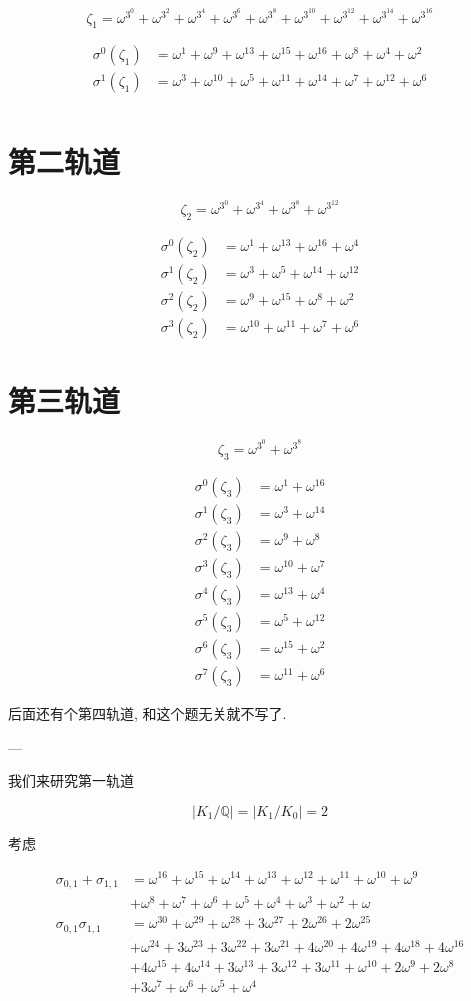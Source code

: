 $$
ζ_1=ω^{3^{0}}+ω^{3^{2}}+ω^{3^{4}}+ω^{3^{6}}+ω^{3^{8}}+ω^{3^{10}}+ω^{3^{12}}+ω^{3^{14}}+ω^{3^{16}}
$$

$$
\begin{aligned}
σ^{0}(ζ_{1})&=ω^{1}+ω^{9}+ω^{13}+ω^{15}+ω^{16}+ω^{8}+ω^{4}+ω^{2}\\
σ^{1}(ζ_{1})&=ω^{3}+ω^{10}+ω^{5}+ω^{11}+ω^{14}+ω^{7}+ω^{12}+ω^{6}\\
\end{aligned}
$$

\section{第二轨道}


$$
ζ_{2}=ω^{3^{0}}+ω^{3^{4}}+ω^{3^{8}}+ω^{3^{12}}
$$

$$
\begin{aligned}
σ^{0}(ζ_{2})&=ω^{1}+ω^{13}+ω^{16}+ω^{4}\\
σ^{1}(ζ_{2})&=ω^{3}+ω^{5}+ω^{14}+ω^{12}\\
σ^{2}(ζ_{2})&=ω^{9}+ω^{15}+ω^{8}+ω^{2}\\
σ^{3}(ζ_{2})&=ω^{10}+ω^{11}+ω^{7}+ω^{6}
\end{aligned}
$$

\section{第三轨道}


$$
ζ_{3}=ω^{3^{0}}+ω^{3^{8}}
$$

$$
\begin{aligned}
σ^{0}(ζ_{3})&=ω^{1}+ω^{16}\\
σ^{1}(ζ_{3})&=ω^{3}+ω^{14}\\
σ^{2}(ζ_{3})&=ω^{9}+ω^{8}\\
σ^{3}(ζ_{3})&=ω^{10}+ω^{7}\\
σ^{4}(ζ_{3})&=ω^{13}+ω^{4}\\
σ^{5}(ζ_{3})&=ω^{5}+ω^{12}\\
σ^{6}(ζ_{3})&=ω^{15}+ω^{2}\\
σ^{7}(ζ_{3})&=ω^{11}+ω^{6}
\end{aligned}
$$

后面还有个第四轨道, 和这个题无关就不写了.

---

我们来研究第一轨道

$$
|K_1/\mathbb{Q}| = |K_1/K_0|=2
$$



考虑

$$
\begin{aligned}
σ_{0,1}+σ_{1,1}&=ω^{16}+ω^{15}+ω^{14}+ω^{13}+ω^{12}+ω^{11}+ω^{10}+ω^9\\
&+ω^8+ω^7+ω^6+ω^5+ω^4+ω^3+ω^2+ω\\
σ_{0,1}σ_{1,1}&=ω^{30}+ω^{29}+ω^{28}+3 ω^{27}+2 ω^{26}+2 ω^{25}\\
&+ω^{24}+3 ω^{23}+3 ω^{22}+3 ω^{21}+4 ω^{20}+4 ω^{19}+4 ω^{18}+4 ω^{16}\\
&+4 ω^{15}+4 ω^{14}+3 ω^{13}+3 ω^{12}+3 ω^{11}+ω^{10}+2 ω^9+2 ω^8\\
&+3 ω^7+ω^6+ω^5+ω^4\\
\end{aligned}
$$

